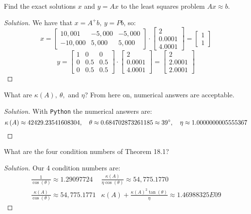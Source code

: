 \documentclass{article}
\newcommand{\il}[1]{\lstinline!#1!}
\newcommand{\parens}[1]{\left(#1\right)}
\newcommand{\sqbracks}[1]{\left[#1\right]}
\begin{document}
		\item Find the exact solutions $x$ and $y = Ax$ to the least squares problem $Ax\approx b$.
		\begin{proof}[Solution]
		We have that $x = A^{+}b,\ y = Pb$, so:
		$$x = \sqbracks{
		\begin{matrix}
		10,001 & -5,000 & -5,000 \\
		-10,000 & 5,000 & 5,000
		\end{matrix} 			
		} \cdot \sqbracks{
	\begin{matrix}
	2 \\
	0.0001 \\
	4.0001 
	\end{matrix}} = \sqbracks{
	\begin{matrix}
	1 \\
	1
	\end{matrix}		
	}$$
	$$y = \sqbracks{
		\begin{matrix}
		1 & 0 & 0 \\
		0 & 0.5 & 0.5 \\
		0 & 0.5 & 0.5
		\end{matrix}				
		} \cdot \sqbracks{
	\begin{matrix}
	2 \\
	0.0001 \\
	4.0001 
	\end{matrix}} = \sqbracks{
	\begin{matrix}
	2 \\
	2.0001 \\
	2.0001 
	\end{matrix}}
	$$
		\end{proof}
		
		\item What are $\kappa\parens{A},\ \theta,$ and $\eta$? From here on, numerical answers are acceptable.
		\begin{proof}[Solution]
		With \il{Python} the numerical answers are:
		$$\kappa\parens{A} \approx 42429.23541608304, \quad \theta \approx 0.684702873261185 \approx 39\degree, \quad \eta \approx 1.0000000005555367$$
		\end{proof}
		
		\item What are the four condition numbers of Theorem 18.1?
		\begin{proof}[Solution]
		Our 4 condition numbers are:
		$$\begin{matrix}
		\displaystyle\frac{1}{\cos\parens{\theta}} \approx 1.29097724 & \displaystyle\frac{\kappa\parens{A}}{\eta \cos\parens{\theta}} \approx 54,775.1770 \\
		\displaystyle\frac{\kappa\parens{A}}{\cos\parens{\theta}} \approx 54,775.1771 & \displaystyle\kappa\parens{A} + \frac{\kappa\parens{A}^2 \tan\parens{\theta}}{\eta} \approx 1.46988325E09
		\end{matrix}$$
		\end{proof}
		
\end{document}
